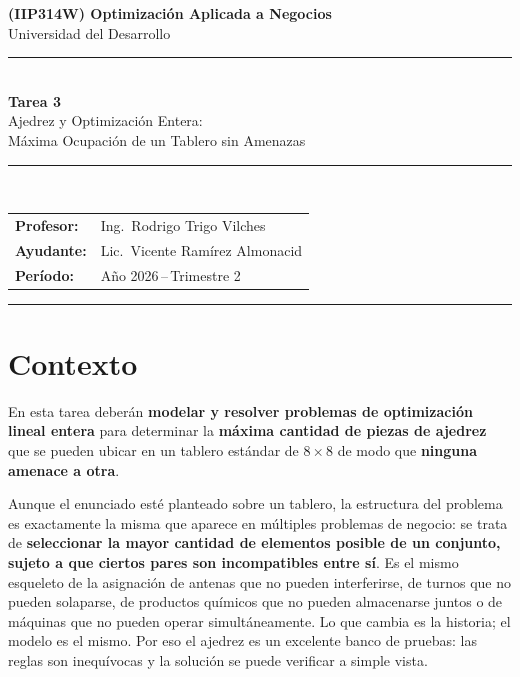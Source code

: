 \documentclass[12pt,a4paper]{article}
\begin{document}

\begin{center}
    {\Large\bfseries\color{uddblue}
     (IIP314W) Optimización Aplicada a Negocios}\\[0.4em]
    {\large Universidad del Desarrollo}\\[0.8em]
    \noindent\rule{\linewidth}{1.5pt}\\[0.5em]
    {\LARGE\bfseries Tarea 3}\\[0.3em]
    {\large Ajedrez y Optimización Entera:\\
     Máxima Ocupación de un Tablero sin Amenazas}\\[0.5em]
    \noindent\rule{\linewidth}{1.5pt}\\[0.8em]
    \begin{tabular}{@{}ll@{}}
        \textbf{Profesor:} & Ing.\ Rodrigo Trigo Vilches \\[0.3em]
        \textbf{Ayudante:} & Lic.\ Vicente Ramírez Almonacid \\[0.3em]
        \textbf{Período:}  & Año 2026\,--\,Trimestre 2
    \end{tabular}
\end{center}

\vspace{1em}
\noindent\rule{\linewidth}{0.4pt}
\vspace{0.5em}

\section*{Contexto}

En esta tarea deberán \textbf{modelar y resolver problemas de optimización lineal
entera} para determinar la \textbf{máxima cantidad de piezas de ajedrez} que se
pueden ubicar en un tablero estándar de $8\times8$ de modo que \textbf{ninguna
amenace a otra}.

Aunque el enunciado esté planteado sobre un tablero, la estructura del problema es
exactamente la misma que aparece en múltiples problemas de negocio: se trata de
\textbf{seleccionar la mayor cantidad de elementos posible de un conjunto, sujeto a
que ciertos pares son incompatibles entre sí}. Es el mismo esqueleto de la
asignación de antenas que no pueden interferirse, de turnos que no pueden
solaparse, de productos químicos que no pueden almacenarse juntos o de máquinas que
no pueden operar simultáneamente. Lo que cambia es la historia; el modelo es el
mismo. Por eso el ajedrez es un excelente banco de pruebas: las reglas son
inequívocas y la solución se puede verificar a simple vista.
\end{document}
